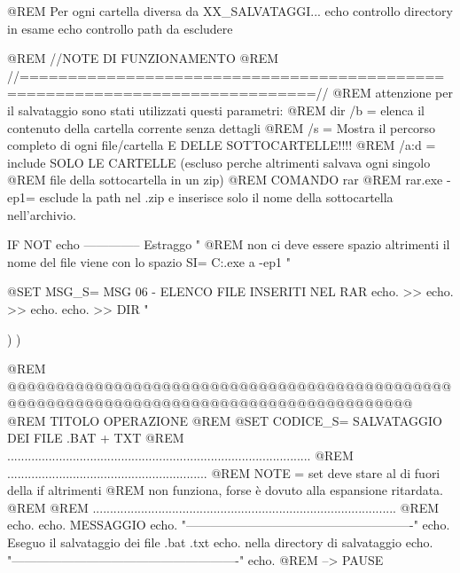 \documentclass[10pt,a4paper]{book}
\begin{document}
{			@REM Per ogni cartella diversa da XX_SALVATAGGI...
			echo controllo directory in esame %
			echo controllo path da escludere %
			
			
			@REM //NOTE DI FUNZIONAMENTO
			@REM //============================================================================//
			@REM attenzione per il salvataggio sono stati utilizzati questi parametri:
			@REM dir 	/b = elenca il contenuto della cartella corrente senza dettagli
			@REM 		/s = Mostra il percorso completo di ogni file/cartella E DELLE SOTTOCARTELLE!!!!
			@REM 		/a:d = include SOLO LE CARTELLE (escluso perche altrimenti salvava ogni singolo
			@REM 		file della sottocartella in un zip)
			@REM 		COMANDO rar
			@REM rar.exe	-ep1= esclude la path nel .zip e inserisce solo il nome della sottocartella nell'archivio.	
			
			
			IF NOT %
			echo --------------  Estraggo "%
			@REM non ci deve essere spazio altrimenti il nome del file viene con lo spazio SI=%
			C:\CASA\Rar.exe a -ep1 "%
			
			@SET MSG_S= MSG 06 - ELENCO FILE INSERITI NEL RAR
			echo.									>> %
			echo.									>> %
			echo. %
			echo.									>> %
			DIR "%
			
			
			
			
			)
			)
			
			
			
			
			@REM @@@@@@@@@@@@@@@@@@@@@@@@@@@@@@@@@@@@@@@@@@@@@@@@@@@@@@@@@@@@@@@@@@@@@@@@@@@@@@@@@@@@@@@@
			@REM 			TITOLO OPERAZIONE
			@REM
			@SET CODICE_S= SALVATAGGIO DEI FILE .BAT + TXT
			@REM ........................................................................................
			@REM ..........................................................
			@REM NOTE = set deve stare al di fuori della if altrimenti 
			@REM non funziona, forse è dovuto alla espansione ritardata.
			@REM
			@REM ........................................................................................
			@REM
			echo.
			echo. MESSAGGIO %
			echo. "-------------------------------------------------------"	
			echo.	Eseguo il salvataggio dei file .bat .txt									
			echo.	nella directory di salvataggio									
			echo. "-------------------------------------------------------"	
			echo.										
			@REM --> PAUSE
			
}
\end{document}
